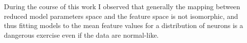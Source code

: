 
During the course of this work I observed that generally the mapping between reduced model parameters space and the feature space is not isomorphic, and thus fitting models to the mean feature values for a distribution of neurons is a dangerous exercise even if the data are normal-like.



